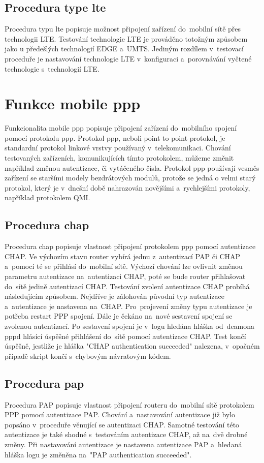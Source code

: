 \subsection{Procedura type lte}
Procedura typu lte popisuje možnost připojení zařízení do~mobilní sítě přes technologii LTE. Testování technologie LTE je prováděno totožným způsobem jako u předešlých technologií EDGE a~UMTS. Jediným rozdílem v~testovací proceduře je nastavování technologie LTE v~konfiguraci a~porovnávání vyčtené technologie s~technologií LTE.

\section{Funkce mobile ppp}
Funkcionalita mobile ppp popisuje připojení zařízení do~mobilního spojení pomocí protokolu ppp. Protokol ppp, neboli point to point protokol, je standardní protokol linkové vrstvy používaný v~telekomunikaci. Chování testovaných zařízeních, komunikujících tímto protokolem, můžeme změnit například změnou autentizace, či vytáčeného čísla. Protokol ppp používají vesměs zařízení se staršími modely bezdrátových modulů, protože se jedná o velmi starý protokol, který je v~dnešní době nahrazován novějšími a~rychlejšími protokoly, například protokolem QMI.

\subsection{Procedura chap}
Procedura chap popisuje vlastnost připojení protokolem ppp pomocí autentizace CHAP. Ve výchozím stavu router vybírá jednu z~autentizací PAP či CHAP a~pomocí té se přihlásí do~mobilní sítě. Výchozí chování lze ovlivnit změnou parametru autentizace na~autentizaci CHAP, poté se bude router přihlašovat do~sítě jedině autentizací CHAP. Testování zvolení autentizace CHAP probíhá následujícím způsobem. Nejdříve je zálohován původní typ autentizace a~autentizace je nastavena na~CHAP. Pro~projevení změny typu autentizace je potřeba restart PPP spojení. Dále je čekáno na~nové sestavení spojení se zvolenou autentizací. Po sestavení spojení je v~logu hledána hláška od~deamona pppd hlásící úspěšné přihlášení do~sítě pomocí autentizace CHAP. Test končí úspěšně, jestliže je hláška "CHAP authentication succeeded" nalezena, v~opačném případě skript končí s~chybovým návratovým kódem.

\subsection{Procedura pap}
Procedura PAP popisuje vlastnost připojení routeru do~mobilní sítě protokolem PPP pomocí autentizace PAP. Chování a~nastavování autentizace již bylo popsáno v~proceduře věnující se autentizaci CHAP. Samotné testování této autentizace je také shodné s~testováním autentizace CHAP, až na~dvě drobné změny. Při nastavování autentizace je nastavena autentizace PAP a~hledaná hláška logu je změněna na~"PAP authentication succeeded".

